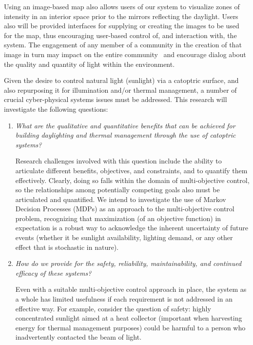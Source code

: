 Using an image-based map 
also allows users of our system to visualize zones of intensity in an interior 
space prior to the mirrors reflecting the daylight. 
Users also will be provided interfaces for supplying or creating the images
to be used for the map, thus encouraging user-based control of, and
interaction with, the system. The engagement of any member of a community 
in the creation of that image in turn may impact on the entire community~\cite{BS13} 
and encourage dialog about the quality and quantity of light within the
environment. 

Given the desire to control natural light (sunlight) via a catoptric surface, and
also repurposing it for illumination and/or thermal management, a number of
crucial cyber-physical systems issues must be addressed.
This research will investigate the following questions:
\begin{enumerate}

\item \emph{What are the qualitative and quantitative benefits
that can be achieved for building daylighting and thermal management
through the use of catoptric systems?}

Research challenges involved with this question include the ability to 
articulate different benefits, objectives, and constraints, and to quantify 
them effectively.  Clearly, doing so falls within the domain
of multi-objective control, so the relationships among potentially competing
goals also must be articulated and quantified. We intend to investigate
the use of Markov Decision Processes (MDPs) as an approach to
the multi-objective control problem, recognizing that maximization
(of an objective function) in expectation is a robust way to acknowledge
the inherent uncertainty of future events (whether it be sunlight availability,
lighting demand, or any other effect that is stochastic in nature).

\item \emph{How do we provide for the safety, reliability, maintainability, and
continued efficacy of these systems?}

Even with a suitable multi-objective control approach in place, the system as
a whole has limited usefulness if each requirement is not
addressed in an effective way.  For example, consider the question of
safety: highly concentrated sunlight aimed at a heat collector (important
when harvesting energy for thermal management purposes) could be harmful
to a person who inadvertently contacted the beam of light. 


\end{enumerate}
